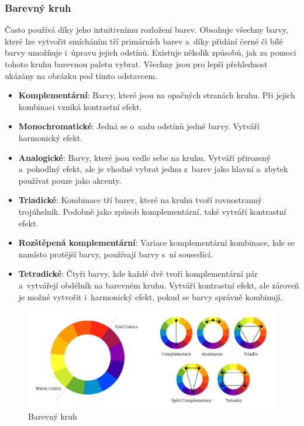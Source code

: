 \subsubsection*{Barevný kruh}
Často používá díky jeho intuitivnímu rozložení barev. Obsahuje všechny barvy, které lze vytvořit smícháním tří primárních barev a~díky přidání černé či bílé barvy umožňuje i~úpravu jejich odstínů. Existuje několik způsobů, jak za pomoci tohoto kruhu barevnou paletu vybrat. Všechny jsou pro lepší přehlednost ukázány na obrázku pod tímto odstavcem.

\begin{itemize}
    \item \textbf{Komplementární}: Barvy, které jsou na opačných stranách kruhu. Při jejich kombinaci vzniká kontrastní efekt.
    \item \textbf{Monochromatické}: Jedná se o~sadu odstínů jedné barvy. Vytváří harmonický efekt.
    \item \textbf{Analogické}: Barvy, které jsou vedle sebe na kruhu. Vytváří přirozený a~pohodlný efekt, ale je vhodné vybrat jednu z~barev jako hlavní a~zbytek používat pouze jako akcenty.
    \item \textbf{Triadické}: Kombinace tří barev, které na kruhu tvoří rovnostranný trojúhelník. Podobně jako způsob komplementární, také vytváří kontrastní efekt.
    \item \textbf{Rozštěpená komplementární}: Variace komplementární kombinace, kde se namísto protější barvy, používají barvy s~ní sousedící. 
    \item \textbf{Tetradické}: Čtyři barvy, kde každé dvě tvoří komplementární pár a~vytvářejí obdélník na barevném kruhu. Vytváří kontrastní efekt, ale zároveň je možné vytvořit i~harmonický efekt, pokud se barvy správně kombinují.
\end{itemize}

\begin{figure}[H]
    \centering
    \includegraphics[width=\textwidth]{resources/figures/color_theory.png}
    \caption[Barevný kruh]{Barevný kruh\footnotemark}
    \label{fig:color-wheel}
\end{figure}

